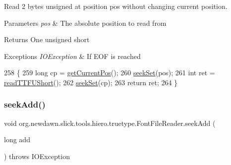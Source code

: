 Read 2 bytes unsigned at position pos without changing current position.


\begin{DoxyParams}{Parameters}
{\em pos} & The absolute position to read from \\
\hline
\end{DoxyParams}
\begin{DoxyReturn}{Returns}
One unsigned short 
\end{DoxyReturn}

\begin{DoxyExceptions}{Exceptions}
{\em I\+O\+Exception} & If E\+OF is reached \\
\hline
\end{DoxyExceptions}

\begin{DoxyCode}
258                                                                 \{
259         \textcolor{keywordtype}{long} cp = \mbox{\hyperlink{classorg_1_1newdawn_1_1slick_1_1tools_1_1hiero_1_1truetype_1_1_font_file_reader_a6eea216bcec24a77aa60baee42672ef9}{getCurrentPos}}();
260         \mbox{\hyperlink{classorg_1_1newdawn_1_1slick_1_1tools_1_1hiero_1_1truetype_1_1_font_file_reader_a9697638485df75a15d10c8b41847241d}{seekSet}}(pos);
261         \textcolor{keywordtype}{int} ret = \mbox{\hyperlink{classorg_1_1newdawn_1_1slick_1_1tools_1_1hiero_1_1truetype_1_1_font_file_reader_a3e37dc36dda05c50af2f546cb377af6c}{readTTFUShort}}();
262         \mbox{\hyperlink{classorg_1_1newdawn_1_1slick_1_1tools_1_1hiero_1_1truetype_1_1_font_file_reader_a9697638485df75a15d10c8b41847241d}{seekSet}}(cp);
263         \textcolor{keywordflow}{return} ret;
264     \}
\end{DoxyCode}
\mbox{\label{classorg_1_1newdawn_1_1slick_1_1tools_1_1hiero_1_1truetype_1_1_font_file_reader_a37dae90ed06904b56b3e941998520174}} 
\subsubsection{\texorpdfstring{seek\+Add()}{seekAdd()}}
{\footnotesize\ttfamily void org.\+newdawn.\+slick.\+tools.\+hiero.\+truetype.\+Font\+File\+Reader.\+seek\+Add (\begin{DoxyParamCaption}\item[{long}]{add }\end{DoxyParamCaption}) throws I\+O\+Exception\hspace{0.3cm}{\ttfamily [inline]}}

